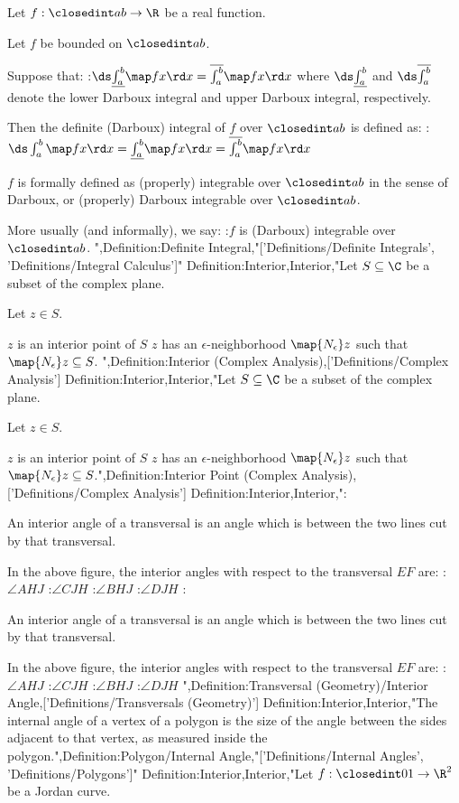 Let $f: \closedint a b \to \R$ be a real function.

Let $f$ be bounded on $\closedint a b$.


Suppose that:
:$\ds \underline {\int_a^b} \map f x \rd x = \overline {\int_a^b} \map f x \rd x$
where $\ds \underline {\int_a^b}$ and $\ds \overline {\int_a^b}$ denote the lower Darboux integral and upper Darboux integral, respectively.


Then the definite (Darboux) integral of $f$ over $\closedint a b$ is defined as:
:$\ds \int_a^b \map f x \rd x = \underline {\int_a^b} \map f x \rd x = \overline {\int_a^b} \map f x \rd x$


$f$ is formally defined as (properly) integrable over $\closedint a b$ in the sense of Darboux, or (properly) Darboux integrable over $\closedint a b$.


More usually (and informally), we say:
:$f$ is (Darboux) integrable over $\closedint a b$.
",Definition:Definite Integral,"['Definitions/Definite Integrals', 'Definitions/Integral Calculus']"
Definition:Interior,Interior,"Let $S \subseteq \C$ be a subset of the complex plane.

Let $z \in S$.


$z$ is an interior point of $S$  $z$ has an $\epsilon$-neighborhood $\map {N_\epsilon} z$ such that $\map {N_\epsilon} z \subseteq S$.
",Definition:Interior (Complex Analysis),['Definitions/Complex Analysis']
Definition:Interior,Interior,"Let $S \subseteq \C$ be a subset of the complex plane.

Let $z \in S$.


$z$ is an interior point of $S$  $z$ has an $\epsilon$-neighborhood $\map {N_\epsilon} z$ such that $\map {N_\epsilon} z \subseteq S$.",Definition:Interior Point (Complex Analysis),['Definitions/Complex Analysis']
Definition:Interior,Interior,":


An interior angle of a transversal is an angle which is between the two lines cut by that transversal.

In the above figure, the interior angles with respect to the transversal $EF$ are:
:$\angle AHJ$
:$\angle CJH$
:$\angle BHJ$
:$\angle DJH$
:


An interior angle of a transversal is an angle which is between the two lines cut by that transversal.

In the above figure, the interior angles with respect to the transversal $EF$ are:
:$\angle AHJ$
:$\angle CJH$
:$\angle BHJ$
:$\angle DJH$
",Definition:Transversal (Geometry)/Interior Angle,['Definitions/Transversals (Geometry)']
Definition:Interior,Interior,"The internal angle of a vertex of a polygon is the size of the angle between the sides adjacent to that vertex, as measured inside the polygon.",Definition:Polygon/Internal Angle,"['Definitions/Internal Angles', 'Definitions/Polygons']"
Definition:Interior,Interior,"Let $f: \closedint 0 1 \to \R^2$ be a Jordan curve.


